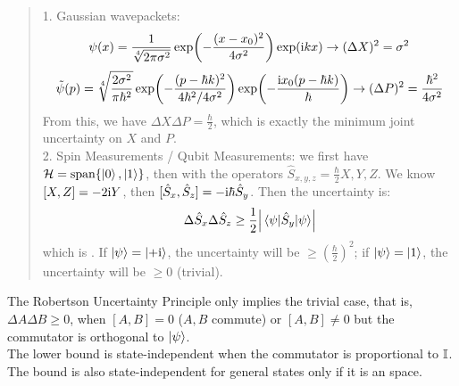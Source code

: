 \begin{quote}
    1. Gaussian wavepackets:
    $$\psi(x) = \frac{1}{\sqrt[4]{2\pi\sigma^2}}\exp(-\frac{(x-x_0)^2}{4\sigma^2})\exp(\mathrm{i} k x) \to (\Delta X)^2 = \sigma^2$$
    $$\tilde{\psi}(p) = \sqrt[4]{\frac{2\sigma^2}{\pi \hbar^2}}\exp(-\frac{(p - \hbar k)^2}{4\hbar^2 / 4\sigma^2})\exp(-\frac{\mathrm{i} x_0 (p-\hbar k)}{\hbar}) \to (\Delta P)^2 = \frac{\hbar^2}{4\sigma^2}$$
    From this, we have $\Delta X \Delta P = \frac{\hbar}{2}$, which is exactly the minimum joint uncertainty on $X$ and $P$. \\
    2. Spin Measurements / Qubit Measurements: we first have $\mathcal{H} = \text{span}\{\ket{0}, \ket{1}\}$, then with the operators $\hat{S}_{x, y, z} = \frac{\hbar}{2}X, Y, Z$. We know $[X, Z] = -2\mathrm{i} Y$, then $[\hat{S}_x, \hat{S}_z] = -\mathrm{i}\hbar \hat{S}_y$. Then the uncertainty is:
    $$\Delta \hat{S}_x \Delta \hat{S}_z \ge \frac{1}{2}\abs{\expval{\hat{S}_y}{\psi}}$$
    which is . If $\ket{\psi} = \ket{+\mathrm{i}}$, the uncertainty will be $\ge (\frac{\hbar}{2})^2$; if $\ket{\psi} = \ket{1}$, the uncertainty will be $\ge 0$ (trivial).
\end{quote}
The Robertson Uncertainty Principle only implies the trivial case, that is, $\Delta A \Delta B \ge 0$, when $[A, B] = 0$ ($A,B$ commute) or $[A, B] \ne 0$ but the commutator is orthogonal to $\ket{\psi}$. \\
The lower bound is state-independent when the commutator is proportional to $\mathbb{I}$. The bound is also state-independent for general states only if it is an  space.

\newpage